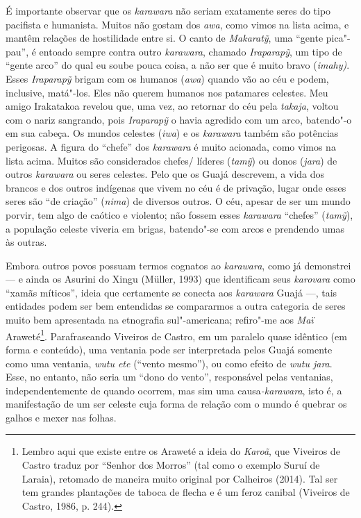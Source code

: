 É importante observar que os \emph{karawara} não seriam exatamente seres
do tipo pacifista e humanista. Muitos não gostam dos \emph{awa}, como
vimos na lista acima, e mantêm relações de hostilidade entre si. O canto
de \emph{Makaratỹ}, uma ``gente pica"-pau'', é entoado sempre contra
outro \emph{karawara}, chamado \emph{Iraparapỹ}, um tipo de ``gente
arco'' do qual eu soube pouca coisa, a não ser que é muito bravo
(\emph{imahy)}. Esses \emph{Iraparapỹ} brigam com os humanos
(\emph{awa}) quando vão ao céu e podem, inclusive, matá"-los. Eles não
querem humanos nos patamares celestes. Meu amigo Irakatakoa revelou que,
uma vez, ao retornar do céu pela \emph{takaja}, voltou com o nariz
sangrando, pois \emph{Iraparapỹ} o havia agredido com um arco, batendo"-o
em sua cabeça. Os mundos celestes (\emph{iwa}) e os \emph{karawara}
também são potências perigosas. A figura do ``chefe'' dos
\emph{karawara} é muito acionada, como vimos na lista acima. Muitos são
considerados chefes/ líderes (\emph{tamỹ}) ou donos (\emph{jara}) de
outros \emph{karawara} ou seres celestes. Pelo que os Guajá descrevem, a
vida dos brancos e dos outros indígenas que vivem no céu é de privação,
lugar onde esses seres são ``de criação'' (\emph{nima}) de diversos
outros. O céu, apesar de ser um mundo porvir, tem algo de caótico e
violento; não fossem esses \emph{karawara} ``chefes'' (\emph{tamỹ}), a
população celeste viveria em brigas, batendo"-se com arcos e prendendo
umas às outras.

Embora outros povos possuam termos cognatos ao \emph{karawara}, como já
demonstrei --- e ainda os Asurini do Xingu (Müller, 1993) que identificam
seus \emph{karovara} como ``xamãs míticos'', ideia que certamente se
conecta aos \emph{karawara} Guajá ---, tais entidades podem ser bem
entendidas se compararmos a outra categoria de seres muito bem
apresentada na etnografia sul"-americana; refiro"-me aos \emph{Maï}
Araweté\footnote{Lembro aqui que existe entre os Araweté a ideia do
  \emph{Karoã}, que Viveiros de Castro traduz por ``Senhor dos Morros''
  (tal como o exemplo Suruí de Laraia), retomado de maneira muito
  original por Calheiros (2014). Tal ser tem grandes plantações de
  taboca de flecha e é um feroz canibal (Viveiros de Castro, 1986, p.
  244).}. Parafraseando Viveiros de Castro, em um paralelo quase
idêntico (em forma e conteúdo), uma ventania pode ser interpretada pelos
Guajá somente como uma ventania, \emph{wutu ete} (``vento mesmo''), ou
como efeito de \emph{wutu jara}. Esse, no entanto, não seria um ``dono do
vento'', responsável pelas ventanias, independentemente de quando
ocorrem, mas sim uma causa\emph{-karawara}, isto é, a manifestação de um
ser celeste cuja forma de relação com o mundo é quebrar os galhos e
mexer nas folhas.

